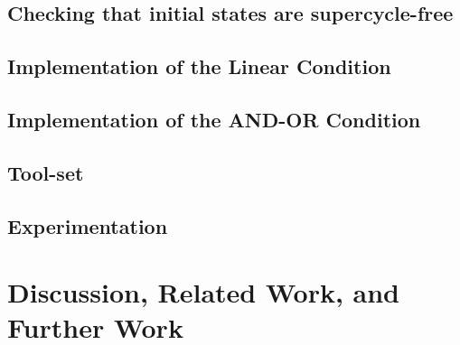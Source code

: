 \documentclass[prodmode,acmtosem]{acmsmall} %
\begin{document}
   \subsection{Checking that initial states are supercycle-free}
   \label{s:initSCFree}
   

   \subsection{Implementation of the Linear Condition}
   \label{s:implLin}
   
   
   \subsection{Implementation of the AND-OR Condition}
   \label{s:implANDOR}
   

   \subsection{Tool-set}
   \label{s:experiments}
   

   \subsection{Experimentation}
   \label{s:experiments}
   

\section{Discussion, Related Work, and Further Work}
\label{s:discussion}








%
\end{document}
